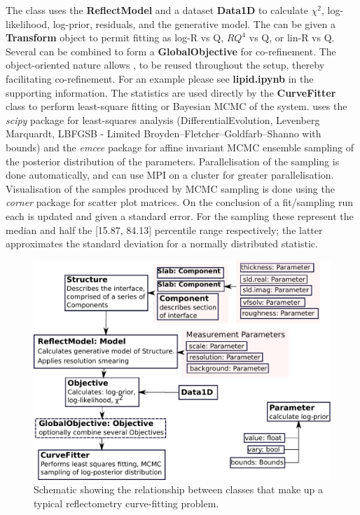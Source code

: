 \documentclass[12pt]{article}
\begin{document}
The \Objective class uses the \textbf{ReflectModel} and a dataset \textbf{Data1D} to calculate $\chi^2$, log-likelihood, log-prior, residuals, and the generative model. The \Objective can be given a \textbf{Transform} object to permit fitting as log-R vs Q, $RQ^4$ vs Q, or lin-R vs Q. Several \Objective can be combined to form a \textbf{GlobalObjective} for co-refinement. The object-oriented nature allows \Parameter, \Component to be reused throughout the setup, thereby facilitating co-refinement. For an example please see \textbf{lipid.ipynb} in the supporting information.
The \Objective statistics are used directly by the \textbf{CurveFitter} class to perform least-square fitting or Bayesian MCMC of the system.  uses the \emph{scipy} package for least-squares analysis (DifferentialEvolution, Levenberg Marquardt, LBFGSB - Limited Broyden–Fletcher–Goldfarb–Shanno with bounds) and the  \emph{emcee} package \cite{emcee} for affine invariant MCMC ensemble sampling of the posterior distribution of the parameters. Parallelisation of the sampling is done automatically, and can use MPI on a cluster for greater parallelisation. Visualisation of the samples produced by MCMC sampling is done using the \emph{corner} package \cite{corner} for scatter plot matrices. On the conclusion of a fit/sampling run each \Parameter is updated and given a standard error. For the sampling these represent the median and half the [15.87, 84.13] percentile range respectively; the latter approximates the standard deviation for a normally distributed statistic.

\begin{figure}
  \includegraphics[width=\linewidth]{components}
  \caption{Schematic showing the relationship between classes that make up a typical reflectometry curve-fitting problem.}
  \label{fig:components}
\end{figure}
\end{document}
